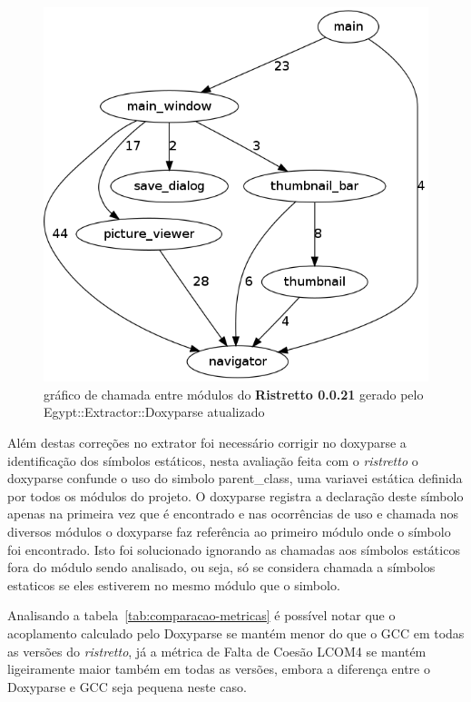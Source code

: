 \begin{figure}
\center
\includegraphics[scale=0.3]{imagens/ristretto-0_0_21-doxyparse-2}
\caption{gráfico de chamada entre módulos do {\bf Ristretto 0.0.21} gerado pelo Egypt::Extractor::Doxyparse atualizado}
\label{fig:ristretto-0.0.21-doxyparse-2}
\end{figure}

Além destas correções no extrator foi necessário corrigir no doxyparse a
identificação dos símbolos estáticos, nesta avaliação feita com o {\it ristretto} o
doxyparse confunde o uso do simbolo parent\_class, uma variavei estática
definida por todos os módulos do projeto. O doxyparse registra a declaração
deste símbolo apenas na primeira vez que é encontrado e nas ocorrências de uso
e chamada nos diversos módulos o doxyparse faz referência ao primeiro módulo
onde o símbolo foi encontrado. Isto foi solucionado ignorando as chamadas aos
símbolos estáticos fora do módulo sendo analisado, ou seja, só se considera
chamada a símbolos estaticos se eles estiverem no mesmo módulo que o simbolo.



Analisando a tabela~\ref{tab:comparacao-metricas}  é possível notar que o acoplamento calculado pelo Doxyparse
se mantém menor do que o GCC em todas as versões do {\it ristretto}, já a métrica de
Falta de Coesão LCOM4 se mantém ligeiramente maior também em todas as versões,
embora a diferença entre o Doxyparse e GCC seja pequena neste caso.

